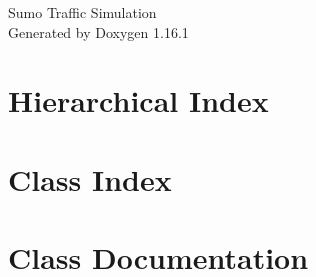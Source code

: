 \documentclass[twoside]{book}
\newcommand{\+}{\discretionary{\mbox{\scriptsize$\hookleftarrow$}}{}{}}
\newcommand{\clearemptydoublepage}{%
    \newpage{\pagestyle{empty}\cleardoublepage}%
  }
\begin{document}
  \raggedbottom
    \hypersetup{pageanchor=false,
                bookmarksnumbered=true,
                pdfencoding=unicode
               }
  \begin{titlepage}
  \vspace*{7cm}
  \begin{center}%
  {\Large Sumo Traffic Simulation}\\
  \vspace*{1cm}
  {\large Generated by Doxygen 1.16.1}\\
  \end{center}
  \end{titlepage}
  \clearemptydoublepage
  \tableofcontents
  \clearemptydoublepage
  \hypersetup{pageanchor=true}

\chapter{Hierarchical Index}

\chapter{Class Index}

\chapter{Class Documentation}













  \backmatter
  \newpage
  \clearemptydoublepage
  \printindex
\end{document}
